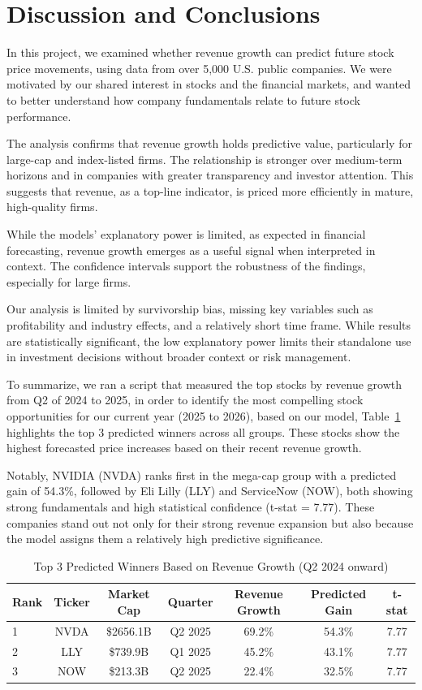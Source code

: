 \documentclass[11pt]{article}
\begin{document}
\section{Discussion and Conclusions}

In this project, we examined whether revenue growth can predict future stock price movements, using data from over 5,000 U.S. public companies. We were motivated by our shared interest in stocks and the financial markets, and wanted to better understand how company fundamentals relate to future stock performance.

The analysis confirms that revenue growth holds predictive value, particularly for large-cap and index-listed firms. The relationship is stronger over medium-term horizons and in companies with greater transparency and investor attention. This suggests that revenue, as a top-line indicator, is priced more efficiently in mature, high-quality firms.

While the models' explanatory power is limited, as expected in financial forecasting, revenue growth emerges as a useful signal when interpreted in context. The confidence intervals support the robustness of the findings, especially for large firms.

Our analysis is limited by survivorship bias, missing key variables such as profitability and industry effects, and a relatively short time frame. While results are statistically significant, the low explanatory power limits their standalone use in investment decisions without broader context or risk management.

To summarize, we ran a script that measured the top stocks by revenue growth from Q2 of 2024 to 2025, in order to identify the most compelling stock opportunities for our current year (2025 to 2026), based on our model, Table~\ref{tab:top-winners} highlights the top 3 predicted winners across all groups.
These stocks show the highest forecasted price increases based on their recent revenue growth.

Notably, NVIDIA (NVDA) ranks first in the mega-cap group with a predicted gain of 54.3\%, followed by Eli Lilly (LLY) and ServiceNow (NOW), both showing strong fundamentals and high statistical confidence (t-stat = 7.77). These companies stand out not only for their strong revenue expansion but also because the model assigns them a relatively high predictive significance. 

\begin{table}[!htbp]
\centering
\caption{Top 3 Predicted Winners Based on Revenue Growth (Q2 2024 onward)}
\label{tab:top-winners}
\begin{tabular}{lcccccc}
\toprule
Rank & Ticker & Market Cap & Quarter & Revenue Growth & Predicted Gain & t-stat \\
\midrule
1 & NVDA & \$2656.1B & Q2 2025 & 69.2\% & 54.3\% & 7.77 \\
2 & LLY  & \$739.9B  & Q1 2025 & 45.2\% & 43.1\% & 7.77 \\
3 & NOW  & \$213.3B  & Q2 2025 & 22.4\% & 32.5\% & 7.77 \\
\bottomrule
\end{tabular}
\end{table}
\end{document}
